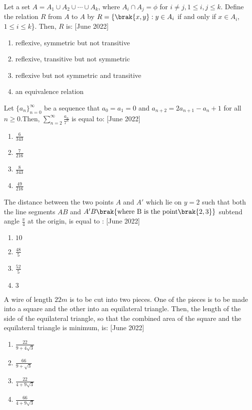 \item Let a set $A=A_1 \cup A_2 \cup \cdots \cup A_k$, where $A_i \cap A_j=\phi$ for $i\neq j,1\leq i,j\leq k$. Define the relation $R$ from $A$ to $A$ by $R=\{\brak{x,y}:y\in A_i$ if and only if $x \in A_i$, $1\leq i \leq k$\}. Then, $R$ is: \hfill[June 2022]

\begin{enumerate}
    \item reflexive, symmetric but not transitive
    \item reflexive, transitive but not symmetric
    \item reflexive but not symmetric and transitive
    \item an equivalence relation 
\end{enumerate}

\item Let $\{a_n\}_{n=0}^{\infty}$ be a sequence that $a_0=a_1=0$ and $a_{n+2}=2a_{n+1}-a_n+1$ for all $n \geq 0$.Then, $\sum_{n=2}^{\infty}\frac{a_n}{7^n}$ is equal to: \hfill[June 2022]
\begin{multicols}{2}
\begin{enumerate}
    \item $\frac{6}{343}$
    \item $\frac{7}{216}$
    \item $\frac{8}{343}$
    \item $\frac{49}{216}$
\end{enumerate}
\end{multicols}

\item The distance between the two points $A$ and $A'$ which lie on $y=2$ such that both the line segments $AB$ and $A'B\brak{\text{where B is the point}\brak{2,3}}$ subtend angle $\frac{\pi}{4}$ at the origin, is equal to : \hfill[June 2022]
\begin{multicols}{2}
\begin{enumerate}
    \item $10$
    \item $\frac{48}{5}$
    \item $\frac{52}{5}$
    \item $3$
\end{enumerate}
\end{multicols}

\item A wire of length $22m$ is to be cut into two pieces. One of the pieces is to be made into a square and the other into an equilateral triangle. Then, the length of the side of the equilateral triangle, so that the combined area of the square and the equilateral triangle is minimum, is: \hfill[June 2022]
\begin{multicols}{2}
\begin{enumerate}
    \item $\frac{22}{9+4\sqrt{3}}$
    \item $\frac{66}{9+\sqrt{3}}$
    \item $\frac{22}{4+9\sqrt{3}}$
    \item $\frac{66}{4+9\sqrt{3}}$
\end{enumerate}
\end{multicols}

